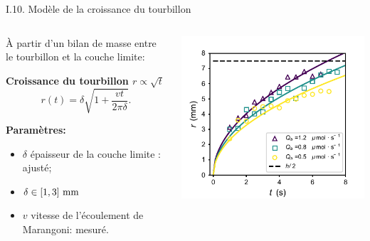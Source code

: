 \documentclass[aspectratio=169,10pt]{beamer}
\begin{document}
\begin{frame}{I.10. Modèle de la croissance du tourbillon}


    \begin{columns}
      \begin{column}{.55\textwidth}
        À partir d'un bilan de masse entre le tourbillon et la couche limite:
    \begin{ombretheo}
        \begin{theo}
            \textbf{Croissance du tourbillon $r\propto \sqrt{t}$}
    \begin{equation}
            r(t)=\delta\sqrt{1+\frac{vt}{2\pi\delta}}\nonumber.
    \end{equation}
\end{theo}
\end{ombretheo}
    
    \textbf{Paramètres:}

    \begin{itemize}
        \item $\delta$ épaisseur de la couche limite : ajusté;
        \item $\delta \in [1,3]~\rm mm$     
        \item $v$ vitesse de l'écoulement de Marangoni: mesuré.
    \end{itemize}

      \end{column}
      \begin{column}{.5\textwidth}
        \includegraphics[width=1\textwidth]{./figures/Rayon_vs_modele.pdf}
      \end{column}
    \end{columns}
\end{frame}
\end{document}
